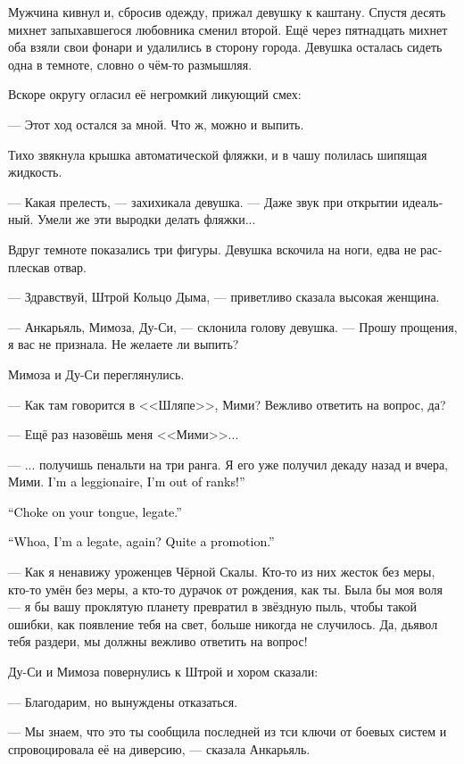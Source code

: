 \documentclass[a4paper,12pt,fleqn]{book}\usepackage{cooltooltips}\usepackage{polyglossia}\setdefaultlanguage[babelshorthands=true]{russian}\setotherlanguage{english}\defaultfontfeatures{Ligatures=TeX,Mapping=tex-text} \usepackage{xcolor}\definecolor{lightgray}{HTML}{bbbbbb}\color{lightgray}\newcommand{\ml}[3]{\textenglish{\textcolor{black}{#3}}}
\begin{document}
Мужчина кивнул и, сбросив одежду, прижал девушку к каштану.
Спустя десять михнет запыхавшегося любовника сменил второй.
Ещё через пятнадцать михнет оба взяли свои фонари и удалились в сторону города.
Девушка осталась сидеть одна в темноте, словно о чём-то размышляя.

Вскоре округу огласил её негромкий ликующий смех:

--- Этот ход остался за мной.
Что ж, можно и выпить.

Тихо звякнула крышка автоматической фляжки, и в чашу полилась шипящая жидкость.

--- Какая прелесть, --- захихикала девушка.
--- Даже звук при открытии идеальный.
Умели же эти выродки делать фляжки...

Вдруг темноте показались три фигуры.
Девушка вскочила на ноги, едва не расплескав отвар.

--- Здравствуй, Штрой Кольцо Дыма, --- приветливо сказала высокая женщина.

--- Анкарьяль, Мимоза, Ду-Си, --- склонила голову девушка.
--- Прошу прощения, я вас не признала.
Не желаете ли выпить?

Мимоза и Ду-Си переглянулись.

--- Как там говорится в <<Шляпе>>, Мими?
Вежливо ответить на вопрос, да?

--- Ещё раз назовёшь меня <<Мими>>...

---  ... получишь пенальти на три ранга.
Я его уже получил декаду назад и вчера, Мими.
\ml{$0$}
{Я легионер, ранги закончились!}
{I'm a leggionaire, I'm out of ranks!''}

\ml{$0$}
{--- Да чтоб ты языком подавился, легат.}
{``Choke on your tongue, legate.''}

\ml{$0$}
{--- О, я снова легат?}
{``Whoa, I'm a legate, again?}
\ml{$0$}
{Ничего себе повышение.}
{Quite a promotion.''}

--- Как я ненавижу уроженцев Чёрной Скалы.
Кто-то из них жесток без меры, кто-то умён без меры, а кто-то дурачок от рождения, как ты.
Была бы моя воля --- я бы вашу проклятую планету превратил в звёздную пыль, чтобы такой ошибки, как появление тебя на свет, больше никогда не случилось.
Да, дьявол тебя раздери, мы должны вежливо ответить на вопрос!

Ду-Си и Мимоза повернулись к Штрой и хором сказали:

--- Благодарим, но вынуждены отказаться.

--- Мы знаем, что это ты сообщила последней из тси ключи от боевых систем и спровоцировала её на диверсию, --- сказала Анкарьяль.
\end{document}
